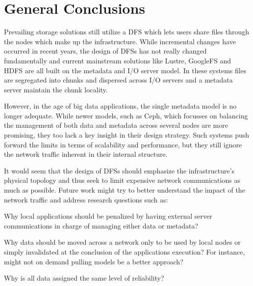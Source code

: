 \documentclass[11pt]{article}
\newenvironment{packed_item}{
\begin{itemize}
  \setlength{\itemsep}{1pt}
  \setlength{\parskip}{0pt}
  \setlength{\parsep}{0pt}
}{\end{itemize}}
\begin{document}
\section{General Conclusions}
Prevailing storage solutions still utilize a DFS which lets users share 
files through the nodes which make up the infrastructure. While incremental 
changes have occurred in recent years, the design of DFSs has not really 
changed fundamentally and current mainstream solutions like Lustre, GoogleFS  
and HDFS are all built on the metadata and I/O server model.  In these 
systems files are segregated into chunks and dispersed across I/O servers and 
a metadata server maintain the chunk locality. 

However, in the age of big data applications, the single metadata model is no 
longer adequate. While newer models, such as Ceph, which focusses on balancing 
the management of both data and metadata across several nodes are more promising, 
they too lack a key insight in their design strategy. Such systems push forward 
the limits in terms of scalability and performance, but they still ignore the 
network traffic inherent in their internal structure.

It would seem that the design of DFSs should emphasize the infrastructure’s 
physical topology and thus seek to limit expensive network communications as 
much as possible. Future work might try to better understand the impact of the 
network traffic and address research questions such as:

\begin{packed_item}
\item Why local applications should be penalized by having external server 
  communications in charge of managing either data or metadata?
\item Why data should be moved across a network only to be used by local nodes or 
  simply invalidated at the conclusion of the applications execution?  For instance, 
  might not on demand pulling models be a better approach?
\item Why is all data assigned the same level of reliability?
\end{packed_item}
\end{document}
